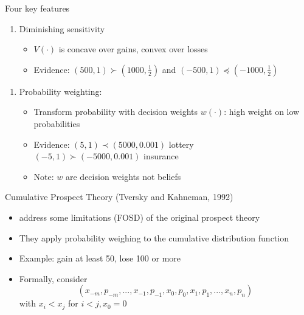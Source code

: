 \documentclass[11pt, aspectratio=169]{beamer}
\begin{document}
\begin{frame}{Four key features}
    \begin{enumerate}[3.]
        \item Diminishing sensitivity\bigskip
            \begin{itemize}
                \item $V(\cdot)$ is concave over gains, convex over losses\medskip
                \item Evidence: $(500,1) \succ (1000,\frac{1}{2})$ and
                \qquad  $(-500,1) \preceq  (-1000,\frac{1}{2})$
            \end{itemize}
            \bigskip
    \end{enumerate}
    \begin{enumerate}[4.]
        \item Probability weighting:\bigskip
            \begin{itemize}
                \item Transform probability with decision weights $w(\cdot)$:
                high weight on low probabilities\medskip
                \item Evidence: $(5,1)\prec (5000,0.001)$ lottery\\
                \qquad  $(-5,1)\succ (-5000,0.001)$ insurance\medskip
            \item Note: $w$ are decision weights not beliefs
        \end{itemize}

    \end{enumerate}
\end{frame}




\begin{frame}{Cumulative Prospect Theory (Tversky and Kahneman, 1992)}
    \begin{itemize}
        \item \citet{TverskyKahneman1992} address some limitations (FOSD) of the original \citet{KahnemanTversky1979} prospect theory \bigskip
        \item They apply probability weighing to the cumulative distribution function\bigskip
        \item Example: gain at least 50, lose 100 or more\bigskip
        \item Formally, consider
        \[(x_{-m},p_{-m},...,x_{-1},p_{-1},x_0,p_0,x_1,p_1,...,x_n,p_n)\]
        with $x_i < x_j$ for $i<j,x_0=0$\bigskip
         \end{itemize}
\end{frame}
\end{document}
